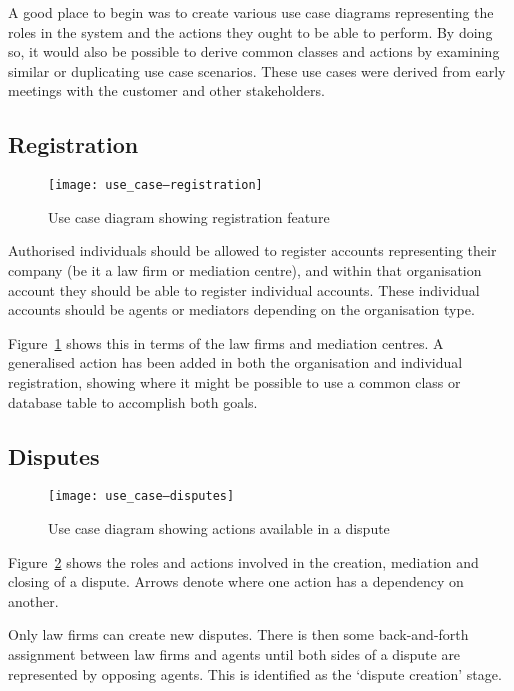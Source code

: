 A good place to begin was to create various use case diagrams representing the roles in the system and the actions they ought to be able to perform. By doing so, it would also be possible to derive common classes and actions by examining similar or duplicating use case scenarios. These use cases were derived from early meetings with the customer and other stakeholders.

\subsection{Registration}

\begin{figure}[h!]
  \centering
    \ifimages
    \texttt{[image: use\_case--registration]}
    \fi
  \caption{Use case diagram showing registration feature}
  \label{uml:useCase:registration}
\end{figure}

Authorised individuals should be allowed to register accounts representing their company (be it a law firm or mediation centre), and within that organisation account they should be able to register individual accounts. These individual accounts should be agents or mediators depending on the organisation type.

Figure~\ref{uml:useCase:registration} shows this in terms of the law firms and mediation centres. A generalised action has been added in both the organisation and individual registration, showing where it might be possible to use a common class or database table to accomplish both goals.

\subsection{Disputes}

\begin{figure}[h!]
  \centering
    \ifimages
    \texttt{[image: use\_case--disputes]}
    \fi
  \caption{Use case diagram showing actions available in a dispute}
  \label{uml:useCase:disputes}
\end{figure}

Figure~\ref{uml:useCase:disputes} shows the roles and actions involved in the creation, mediation and closing of a dispute. Arrows denote where one action has a dependency on another.

Only law firms can create new disputes. There is then some back-and-forth assignment between law firms and agents until both sides of a dispute are represented by opposing agents. This is identified as the `dispute creation' stage.

